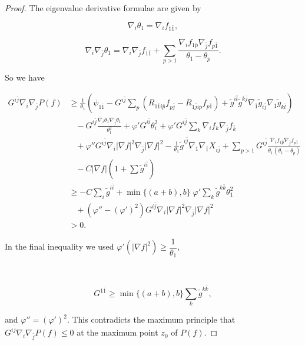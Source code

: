 \documentclass[11pt,letterpaper]{amsart}
\newcommand{\bi}{\bar{i}}
\newcommand{\bj}{\bar{j}}
\newcommand{\bk}{\bar{k}}
\newcommand{\bl}{\bar{l}}
\numberwithin{equation}{section}
\begin{document}
\begin{itemize}
\begin{proof}
The eigenvalue derivative formulae are given by


    $$\nabla_i \theta_1 = \nabla_i f_{1\bar{1}},$$



   $$\nabla_i \nabla_{\bar{j}} \theta_1 = \nabla_i \nabla_{\bar{j}} f_{1\bar{1}} + \sum_{p > 1} \frac{\nabla_i f_{1\bar{p}} \nabla_{\bar{j}} f_{p\bar{1}}}{\theta_1 - \theta_p}.$$ 



So we have

\begin{equation}
    \begin{aligned}
        G^{i \bj} \nabla_i \nabla_{\bj} P(f) &\geq \frac{1}{\theta_1} \left(\psi_{1 \bar 1}-G^{i \bj} \sum_p (R_{1 \bar 1 i \bar p} f_{p \bar j} - R_{1 \bar j i \bar p} f_{p \bar 1}) + \tilde g^{i \bl}\tilde g^{k \bj} \nabla_{\bar 1} \tilde g_{i \bj} \nabla_1 \tilde g_{k \bl}\right) \\
        & \;\;\;- G^{i \bj} \frac{\nabla_{i} \theta_{1} \nabla_{\bj} \theta_{1}}{\theta_1^2} + \varphi' G^{i \bi} \theta_i^2 + \varphi' G^{i \bj} \sum_k\nabla_i f_k \nabla_{\bj} f_{\bk} \\
        & \;\;\;+ \varphi''G^{i \bj} \nabla_i|\nabla f|^2 \nabla_{\bj} |\nabla f|^2 -   \frac{1}{\theta_1}\tilde g^{i \bj}  \nabla_{1} \nabla_{\bar 1} X_{i \bj}+ \sum_{p > 1} G^{i \bj}\frac{\nabla_i f_{1\bar{p}} \nabla_{\bar{j}} f_{p\bar{1}}}{\theta_1(\theta_1 - \theta_p)} \\
        &\;\;\;- C|\nabla f|(1 + \sum \tilde g^{i \bi})\\
        &\geq -C \sum_i \tilde g^{i \bi} + \min\{(a+b),b\}\;\varphi'\sum_k \tilde g^{k \bk} \theta_1^2 \\
        &\;\;\; + (\varphi'' - (\varphi')^2)G^{i \bj} \nabla_i|\nabla f|^2 \nabla_{\bj} |\nabla f|^2 \\
        &>0.
    \end{aligned}
\end{equation}


In the final inequality we used $\varphi'(|\nabla f|^2) \geq \dfrac{1}{\theta_1}$, 

\

\begin{equation}\label{Gg}
    G^{1 \bar 1} \geq \min\{(a+b),b\} \sum_k \tilde g^{k \bk} ,
\end{equation}

\noindent and $\varphi''= (\varphi')^2$. This contradicts the maximum principle that $G^{i \bj} \nabla_i \nabla_{\bj} P(f) \leq 0$ at the maximum point $z_0$ of $P(f)$. 


\end{proof}
\end{itemize}
\end{document}
